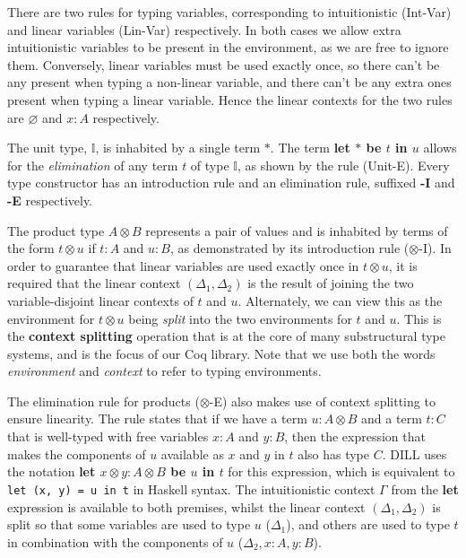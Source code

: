 \documentclass[]{unswthesis}
\let\emptyset\varnothing
\let\c\texttt
\let\i\textit
\let\b\textbf
\begin{document}
There are two rules for typing variables, corresponding to intuitionistic (Int-Var) and linear variables (Lin-Var) respectively. In both cases we allow extra intuitionistic variables to be present in the environment, as we are free to ignore them. Conversely, linear variables must be used exactly once, so there can't be any present when typing a non-linear variable, and there can't be any extra ones present when typing a linear variable. Hence the linear contexts for the two rules are $\emptyset$ and $x : A$ respectively.

The unit type, $\mathds{I}$, is inhabited by a single term $*$. The term \b{let $*$ be $t$ in $u$} allows for the \i{elimination} of any term $t$ of type $\mathds{I}$, as shown by the rule (Unit-E). Every type constructor has an introduction rule and an elimination rule, suffixed \b{-I} and \b{-E} respectively.

The product type $A \otimes B$ represents a pair of values and is inhabited by terms of the form $t \otimes u$ if $t : A$ and $u : B$, as demonstrated by its introduction rule ($\otimes$-I). In order to guarantee that linear variables are used exactly once in $t \otimes u$, it is required that the linear context $(\Delta_1, \Delta_2)$ is the result of joining the two variable-disjoint linear contexts of $t$ and $u$. Alternately, we can view this as the environment for $t \otimes u$ being \i{split} into the two environments for $t$ and $u$. This is the \b{context splitting} operation that is at the core of many substructural type systems, and is the focus of our Coq library. Note that we use both the words \i{environment} and \i{context} to refer to typing environments.

The elimination rule for products ($\otimes$-E) also makes use of context splitting to ensure linearity. The rule states that if we have a term $u : A \otimes B$ and a term $t : C$ that is well-typed with free variables $x : A$ and $y : B$, then the expression that makes the components of $u$ available as $x$ and $y$ in $t$ also has type $C$. DILL uses the notation \b{let $x \otimes y : A \otimes B$ be $u$ in $t$} for this expression, which is equivalent to \c{let (x, y) = u in t} in Haskell syntax. The intuitionistic context $\Gamma$ from the \b{let} expression is available to both premises, whilst the linear context $(\Delta_1, \Delta_2)$ is split so that some variables are used to type $u$ ($\Delta_1$), and others are used to type $t$ in combination with the components of $u$ ($\Delta_2, x : A, y : B$).
\end{document}
